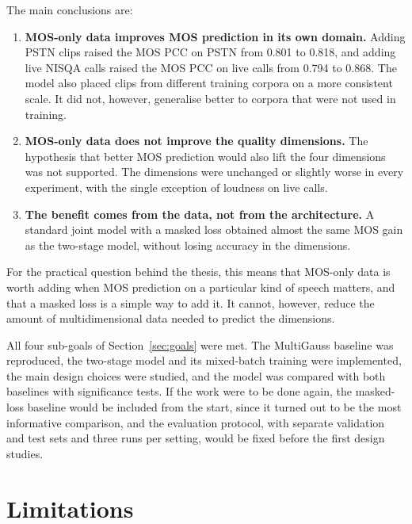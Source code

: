 \documentclass[
english,                 %
bibtex,                  %
includeExtraAbstracts, %
]{kththesis}
\numberwithin{listing}{chapter}
\begin{document}
The main conclusions are:
\begin{enumerate}
\item \textbf{MOS-only data improves MOS prediction in its own domain.} Adding PSTN clips raised the MOS PCC on PSTN from 0.801 to 0.818, and adding live NISQA calls raised the MOS PCC on live calls from 0.794 to 0.868. The model also placed clips from different training corpora on a more consistent scale. It did not, however, generalise better to corpora that were not used in training.
\item \textbf{MOS-only data does not improve the quality dimensions.} The hypothesis that better MOS prediction would also lift the four dimensions was not supported. The dimensions were unchanged or slightly worse in every experiment, with the single exception of loudness on live calls.
\item \textbf{The benefit comes from the data, not from the architecture.} A standard joint model with a masked loss obtained almost the same MOS gain as the two-stage model, without losing accuracy in the dimensions.
\end{enumerate}

For the practical question behind the thesis, this means that MOS-only data is worth adding when MOS prediction on a particular kind of speech matters, and that a masked loss is a simple way to add it. It cannot, however, reduce the amount of multidimensional data needed to predict the dimensions.

All four sub-goals of Section~\ref{sec:goals} were met. The MultiGauss baseline was reproduced, the two-stage model and its mixed-batch training were implemented, the main design choices were studied, and the model was compared with both baselines with significance tests. If the work were to be done again, the masked-loss baseline would be included from the start, since it turned out to be the most informative comparison, and the evaluation protocol, with separate validation and test sets and three runs per setting, would be fixed before the first design studies.

\section{Limitations}
\label{sec:limitations}
\end{document}
